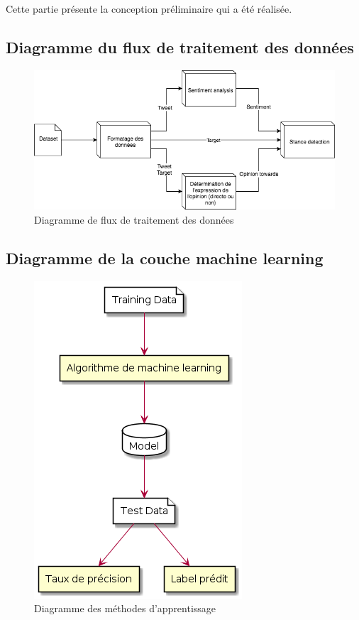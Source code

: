 \par Cette partie présente la conception préliminaire qui a été réalisée.



\subsection{Diagramme du flux de traitement des données}
\begin{figure}[h!]
	\centerline{\includegraphics[scale=0.8]{img/diagramme_flux_traitement.png}}
	\caption{Diagramme de flux de traitement des données}
\end{figure}
\newpage

\subsection {Diagramme de la couche machine learning}
\begin{figure}[h!]
	\centerline{\includegraphics[scale=0.8]{img/diagramme_machine_learning.png}}
	\caption{Diagramme des méthodes d'apprentissage}
\end{figure}
\newpage

